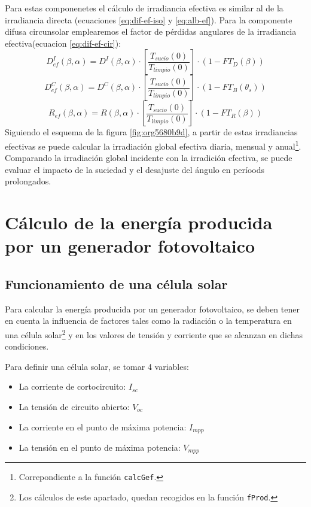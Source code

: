 Para estas componenetes el cálculo de irradiancia efectiva es similar al de la irradiancia directa (ecuaciones \ref{eq:dif-ef-iso} y \ref{eq:alb-ef}). Para la componente difusa circunsolar emplearemos el factor de pérdidas angulares de la irradiancia efectiva(ecuacion \ref{eq:dif-ef-cir}):
\begin{equation}
D_{ef}^I(\beta ,\alpha)=D^I(\beta ,\alpha)\cdot[\frac{T_{sucio}(0)}{T_{limpio}(0)}]\cdot (1-FT_D(\beta))
\label{eq:dif-ef-iso}
\end{equation}
\begin{equation}
D_{ef}^C(\beta ,\alpha)=D^C(\beta ,\alpha)\cdot[\frac{T_{sucio}(0)}{T_{limpio}(0)}]\cdot (1-FT_B(\theta_s))
\label{eq:dif-ef-cir}
\end{equation}
\begin{equation}
R_{ef}(\beta ,\alpha)=R(\beta ,\alpha)\cdot[\frac{T_{sucio}(0)}{T_{limpio}(0)}]\cdot (1-FT_R(\beta))
\label{eq:alb-ef}
\end{equation}
Siguiendo el esquema de la figura \ref{fig:org5680b9d}, a partir de estas irradiancias efectivas se puede calcular la irradiación global efectiva diaria, mensual y anual\footnote{Correpondiente a la función \texttt{calcGef}.}. Comparando la irradiación global incidente con la irradición efectiva, se puede evaluar el impacto de la suciedad y el desajuste del ángulo en períoods prolongados.

\section{Cálculo de la energía producida por un generador fotovoltaico}
\label{sec:orgfa0c56d}
\label{sec:calculo-energia-producida-generador}

\subsection{Funcionamiento de una célula solar}
\label{sec:org3e320c5}
\label{subsec:funcionamiento-celula-solar}
Para calcular la energía producida por un generador fotovoltaico, se deben tener en cuenta la influencia de factores tales como la radiación o la temperatura en una célula solar\footnote{Los cálculos de este apartado, quedan recogidos en la función \texttt{fProd}.} y en los valores de tensión y corriente que se alcanzan en dichas condiciones.

Para definir una célula solar, se tomar 4 variables:
\begin{itemize}
\item La corriente de cortocircuito: \(I_{sc}\)
\item La tensión de circuito abierto: \(V_{oc}\)
\item La corriente en el punto de máxima potencia: \(I_{mpp}\)
\item La tensión en el punto de máxima potencia: \(V_{mpp}\)
\end{itemize}

